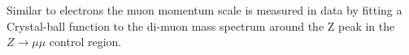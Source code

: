 Similar to electrons the muon momentum scale is measured in data by fitting a Crystal-ball function to the di-muon mass spectrum around the Z peak in the 
$Z \rightarrow \mu\mu$ control region.


